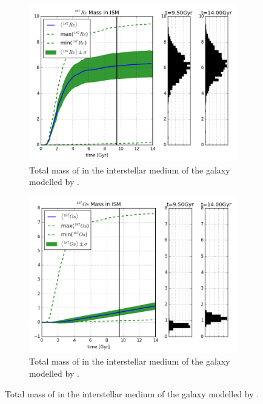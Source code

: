 \begin{figure}
  \centering
  \begin{subfigure}{\subfigwidth}
    \includegraphics[width=\linewidth]{results/MCExperiment_revised_2/combined_plot_Re-187_decayed.png}
    \caption{\label{fig:MCExperiment-decay-re187}
      Total mass of  in the interstellar medium of the galaxy modelled by \omegamodel.
    }
  \end{subfigure}
  \begin{subfigure}{\subfigwidth}
    \includegraphics[width=\linewidth]{results/MCExperiment_revised_2/combined_plot_Os-187_decayed.png}
    \caption{\label{fig:MCExperiment-decay-os187}
      Total mass of  in the interstellar medium of the galaxy modelled by \omegamodel.
}
\end{subfigure}
\end{figure}
